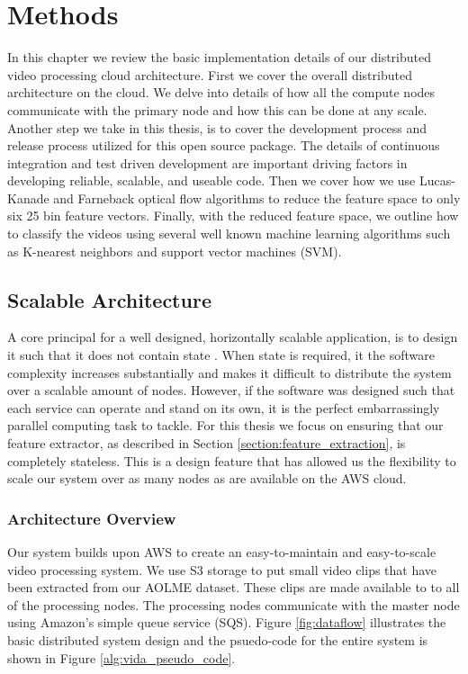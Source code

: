 \chapter{Methods}
In this chapter we review the basic implementation details of our distributed
video processing cloud architecture. First we cover the overall distributed
architecture on the cloud.  We delve into details of how all the compute nodes
communicate with the primary node and how this can be done at any scale. Another
step we take in this thesis,  is to cover the development process and release
process utilized for this open source package. The details of continuous
integration and test driven development are  important driving factors in
developing reliable, scalable, and useable code.  Then we cover how we use
Lucas-Kanade and Farneback optical flow algorithms to reduce the feature space
to only six 25 bin feature vectors. Finally, with the reduced feature space, we
outline how to classify the videos using several well known machine learning
algorithms such as K-nearest neighbors and support vector machines (SVM).

\section{\label{section:distributed_processing}Scalable Architecture}
A core principal for a well designed, horizontally scalable application, is
to design it such that it does not contain state \cite{awsbestpractices}.
When state is required, it the software complexity increases substantially and
makes it difficult to distribute the system over a scalable amount of nodes.
However, if the software was designed such that each service can operate and
stand on its own, it is the perfect embarrassingly parallel computing task to
tackle. For this thesis we focus on ensuring that our feature extractor,
as described in Section \ref{section:feature_extraction}, is completely stateless.
This is a design feature that has allowed us the flexibility to scale our
system over as many nodes as are available on the AWS cloud.

\subsection{\label{subsection:architecture_overview}Architecture Overview}
Our system builds upon AWS to create an easy-to-maintain and easy-to-scale
video processing system. We use S3 storage to put small video clips that
have been extracted from our AOLME dataset. These clips are made available to
to all of the processing nodes. The processing nodes communicate with the master
node using Amazon's simple queue service (SQS). Figure \ref{fig:dataflow} illustrates
the basic distributed system design and the psuedo-code for the entire system
is shown in Figure \ref{alg:vida_pseudo_code}.

